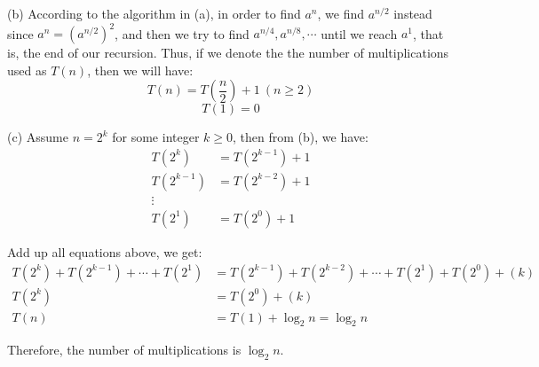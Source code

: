 \documentclass[a4paper,11pt]{article}
\begin{document}
\begin{spacing}{1.4}
    \setlength{\parindent}{0em}

    \vspace{5pt}

    (b) According to the algorithm in (a), in order to find $a^n$,
    we find $a^{n/2}$ instead since $a^n=(a^{n/2})^2$,
    and then we try to find $a^{n/4}, a^{n/8}, \cdots$ until
    we reach $a^{1}$, that is, the end of our recursion.
    Thus, if we denote the the number of multiplications used as 
    $T(n)$, then we will have: 
    $$T(n)=T\left(\frac{n}{2}\right)+1\ (n\ge 2)$$
    $$T(1)=0$$

    \vspace{5pt}

    (c) Assume $n=2^k$ for some integer $k\ge 0$, then from (b), we have:
    \begin{align*}
        T(2^k)&=T(2^{k-1})+1\\
        T(2^{k-1})&=T(2^{k-2})+1\\
        \vdots\\
        T(2^1)&=T(2^{0})+1
    \end{align*}

    Add up all equations above, we get:
    \begin{align*}
        T(2^k)+T(2^{k-1})+\cdots + T(2^1)&=T(2^{k-1})+T(2^{k-2})+\cdots 
        + T(2^1)+T(2^0)+(k)\\
        T(2^k)&=T(2^0)+(k)\\
        T(n)&=T(1)+\log_2 n=\log_2 n
    \end{align*}

    Therefore, the number of multiplications is $\log_2 n$.



    
    \end{spacing}
\end{document}
